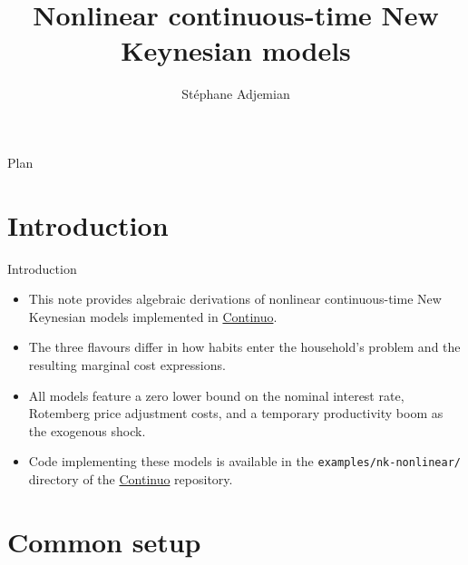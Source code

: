 \documentclass[11pt,aspectratio=169]{beamer}
\title{Nonlinear continuous-time New Keynesian models}
\author{Stéphane Adjemian}
\institute{Université du Mans}
\begin{document}
\begin{frame}
\titlepage
\end{frame}


\begin{frame}{Plan}
\tableofcontents
\end{frame}

\section{Introduction}

\begin{frame}{Introduction}

\begin{itemize}

\item This note provides algebraic derivations of nonlinear continuous-time New Keynesian models implemented in \href{https://continuo.adjemian.eu}{Continuo}.\newline

\item The three flavours differ in how habits enter the household's problem and the resulting marginal cost expressions.\newline

\item All models feature a zero lower bound on the nominal interest rate, Rotemberg price adjustment costs, and a temporary productivity boom as the exogenous shock.\newline

\item Code implementing these models is available in the \texttt{examples/nk-nonlinear/} directory of the \href{https://github.com/stepan-a/continuo}{Continuo} repository.

\end{itemize}

\end{frame}

\section{Common setup}
\end{document}
